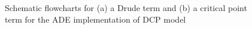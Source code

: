 \begin{figure}[hp!]
  \begin{center}
  \end{center}
  \caption{Schematic flowcharts for (a) a Drude term and (b) a critical point term for the ADE implementation of DCP model}
  \label{fig:ade_memory}
\end{figure}


